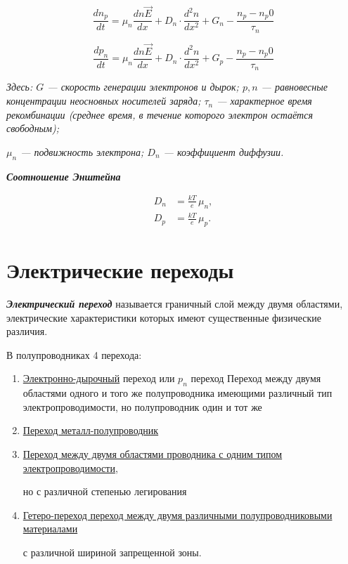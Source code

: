 \documentclass[../main.tex]{subfiles}
\begin{document}
\[\frac{d n_p}{d t} = \mu_n \frac{d n \vec E}{dx} + D_n \cdot \frac{d^2 n}{dx^2}+ G_n - \frac{n_p - n_p0}{\tau_n}\]

\[\frac{d p_n}{d t} = \mu_n \frac{d n \vec E}{dx} + D_n \cdot \frac{d^2 n}{dx^2}+ G_p - \frac{n_p - n_p0}{\tau_n}\]

\begin{center}
    \textit{Здесь: $G$ — скорость генерации электронов и дырок; $p, n$ — равновесные концентрации неосновных носителей заряда; 
    $\tau_n$ — характерное время рекомбинации (среднее время, в течение которого электрон остаётся свободным);}
    
    \textit{$\mu_n$ — подвижность электрона; $D_n$ — коэффициент диффузии.}
    \end{center}

\textbf{\textit{Соотношение Энштейна}}

\[
\boxed{
\begin{aligned}
D_n &= \frac{kT}{e} \, \mu_n, \\[6pt]
D_p &= \frac{kT}{e} \, \mu_p.
\end{aligned}
}
\]

\section{Электрические переходы}

 \textit{\textbf{Электрический переход}} называется граничный слой между двумя областями, электрические характеристики которых имеют существенные физические различия.

\vspace{10px}

В полупроводниках 4 перехода:

\begin{enumerate}
    \item \underline{Электронно-дырочный} переход или $p_n$ переход
    Переход между двумя областями одного и того же полупроводника имеющими различный тип электропроводимости, но полупроводник один и тот же
    \item \underline{Переход металл-полупроводник}
    \item \underline{Переход между двумя областями проводника с одним типом электропроводимости}, 
    
    но с различной степенью легирования
    \item \underline{Гетеро-переход переход между двумя различными полупроводниковыми материалами}
    
    с различной шириной запрещенной зоны.
\end{enumerate}
\end{document}
